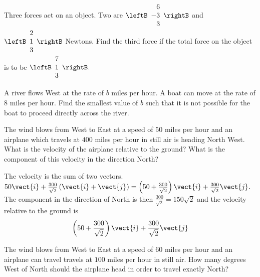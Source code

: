 \begin{enumialphparenastyle}
\begin{ex} Three forces act on an object. Two are $\leftB
\begin{array}{r}
6 \\
-3 \\
3
\end{array}
\rightB $ and $\leftB
\begin{array}{r}
2 \\
1 \\
3
\end{array}
\rightB $ Newtons. Find the third force if the total force on the object is
to be $\leftB
\begin{array}{r}
7 \\
1 \\
3
\end{array}
\rightB .$ \vspace{1mm}
\end{ex}

\begin{ex} A river flows West at the rate of $b$ miles per hour. A boat can move
at the rate of $8$ miles per hour. Find the smallest value of $b$ such that
it is not possible for the boat to proceed directly across the river.
\vspace{1mm}
\end{ex}

\begin{ex} The wind blows from West to East at a speed of $50$ miles per hour and
an airplane which travels at $400$ miles per hour in still air is heading
North West. What is the velocity of the airplane relative to the ground?
What is the component of this velocity in the direction North? \vspace{1mm}
\begin{sol}
The velocity is the sum of two vectors. $50\vect{i}+\frac{
300}{\sqrt{2}} \left( \vect{i}+\vect{j}\right) =\left( 50+\frac{300}{\sqrt{2}}
\right) \vect{i}+ \frac{300}{\sqrt{2}}\vect{j}.$ The component in the
direction of North is then $\frac{300}{\sqrt{2}}= 150\sqrt{2}$
and the velocity relative to the ground is
\[
\left( 50+\frac{300}{\sqrt{2}}\right) \vect{i}+\frac{300}{\sqrt{2}}\vect{j}
\]
\end{sol}
\end{ex}

\begin{ex} The wind blows from West to East at a speed of $60$ miles per hour and
an airplane can travel travels at $100$ miles per hour in still air. How
many degrees West of North should the airplane head in order to travel
exactly North? \vspace{1mm}
\end{ex}



\end{enumialphparenastyle}
